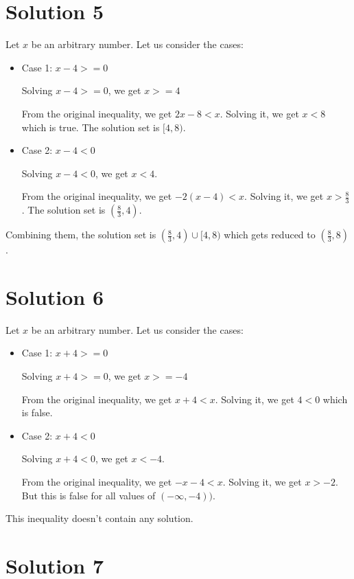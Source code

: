 \documentclass{article}
\begin{document}
\section{Solution 5}

Let $x$ be an arbitrary number. Let us consider the cases:

\begin{itemize}
\item Case 1: $x - 4 >= 0$

  Solving $x - 4 >= 0$, we get $x >= 4$

  From the original inequality, we get $2x - 8 < x$. Solving it, we
  get $x < 8$ which is true. The solution set is $[4, 8)$.

\item Case 2: $x - 4 < 0$

  Solving $x - 4 < 0$, we get $x < 4$.

  From the original inequality, we get $-2(x - 4) < x$. Solving it, we
  get $x > \frac{8}{3}$. The solution set is $(\frac{8}{3}, 4)$.
\end{itemize}

Combining them, the solution set is $(\frac{8}{3}, 4) \cup [4, 8)$ which
gets reduced to $(\frac{8}{3}, 8)$.

\section{Solution 6}

Let $x$ be an arbitrary number. Let us consider the cases:

\begin{itemize}
\item Case 1: $x + 4 >= 0$

  Solving $x + 4 >= 0$, we get $x >= -4$

  From the original inequality, we get $x + 4 < x$. Solving it, we
  get $4 < 0$ which is false.

\item Case 2: $x + 4 < 0$

  Solving $x + 4 < 0$, we get $x < -4$.

  From the original inequality, we get $-x - 4 < x$. Solving it, we
  get $x > -2$. But this is false for all values of $(-\infty, -4))$.
\end{itemize}

This inequality doesn't contain any solution.

\section{Solution 7}
\end{document}
